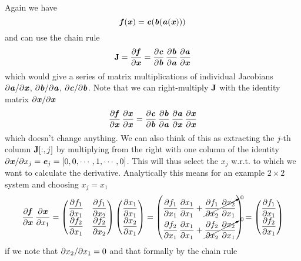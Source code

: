 \documentclass[paper=a4,11pt,headsepline]{scrartcl}
\begin{document}
Again we have
\begin{equation*}
    \ve f(\ve x) = \ve c(\ve b(\ve a(\ve x)))
\end{equation*}
and can use the chain rule
\begin{equation*}
    \ma J=\pd{\ve f}{\ve x} = \pd{\ve c}{\ve b}\,\pd{\ve b}{\ve a}\,\pd{\ve a}{\ve x}
\end{equation*}
which would give a series of matrix multiplications of individual Jacobians $\pdi{\ve
a}{\ve x}$, $\pdi{\ve b}{\ve a}$, $\pdi{\ve c}{\ve b}$.
Note that we can right-multiply $\ma J$ with the identity
matrix $\pdi{\ve x}{\ve x}$
\begin{equation*}
    \pd{\ve f}{\ve x}\,\pd{\ve x}{\ve x} =
    \pd{\ve c}{\ve b}\,\pd{\ve b}{\ve a}\,\pd{\ve a}{\ve x}\,\pd{\ve x}{\ve x}
\end{equation*}
which doesn't change anything. We can also think of this as extracting the
$j$-th column $\ma J[:,j]$ by multiplying from the right with one column of the
identity $\partial\ve x/\partial x_j = \ve e_j = [0,0,\cdots,1,\cdots, 0]$.
This will thus select the $x_j$ w.r.t. to which we want to calculate the
derivative. Analytically this means for an example $2\times 2$ system and choosing
$x_j = x_1$
\begin{equation*}
    \pd{\ve f}{\ve x}\,\pd{\ve x}{x_1}=
    \begin{pmatrix}
        \pd{f_1}{x_1} & \pd{f_1}{x_2} \\
        \pd{f_2}{x_1} & \pd{f_2}{x_2} \\
    \end{pmatrix}
    \begin{pmatrix}
        \pd{x_1}{x_1} \\
        \pd{x_2}{x_1} \\
    \end{pmatrix}
    =
    \begin{pmatrix}
        \pd{f_1}{x_1}\,\pd{x_1}{x_1} + \cancelto{0}{\pd{f_1}{x_2}\,\pd{x_2}{x_1}} \\
        \pd{f_2}{x_1}\,\pd{x_1}{x_1} + \cancelto{0}{\pd{f_2}{x_2}\,\pd{x_2}{x_1}} \\
    \end{pmatrix}
    =
    \begin{pmatrix}
        \pd{f_1}{x_1} \\
        \pd{f_2}{x_1} \\
    \end{pmatrix}
\end{equation*}
if we note that $\pdi{x_2}{x_1}=0$ and that formally by the chain rule
\end{document}
